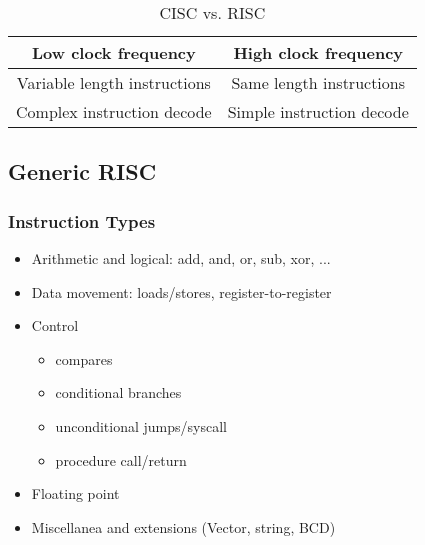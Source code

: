 \documentclass[12pt]{article}
\begin{document}
\begin{itemize}
\begin{table}[]
\begin{tabular}{cc}
\multicolumn{1}{|c|}{Low clock frequency}                                                                           & \multicolumn{1}{c|}{High clock frequency}                                                                             \\ \hline
\multicolumn{1}{|c|}{Variable length instructions}                                                                  & \multicolumn{1}{c|}{Same length instructions}                                                                         \\ \hline
\multicolumn{1}{|c|}{Complex instruction decode}                                                                    & \multicolumn{1}{c|}{Simple instruction decode}                                                                        \\ \hline
\end{tabular}
                            \caption{CISC vs. RISC}
                        \end{table}
                \end{itemize}
        \subsection{Generic RISC}
            \subsubsection{Instruction Types}
                \begin{itemize}
                    \item {Arithmetic and logical: add, and, or, sub, xor, ...}
                    \item {Data movement: loads/stores, register-to-register}
                    \item {Control}
                        \begin{itemize}
                            \item {compares}
                            \item {conditional branches}
                            \item {unconditional jumps/syscall}
                            \item {procedure call/return}
                        \end{itemize}
                    \item {Floating point}
                    \item {Miscellanea and extensions (Vector, string, BCD)}
                \end{itemize}
\end{document}
